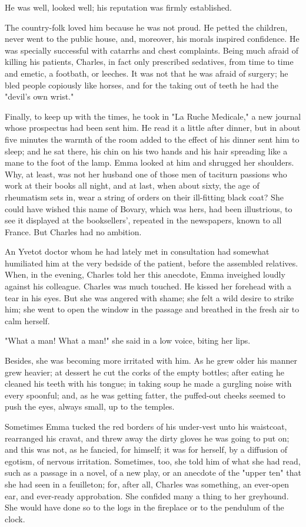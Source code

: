\documentclass[11pt,twocolumn]{ltugboat}
\begin{document}
He was well, looked well; his reputation was firmly established.

The country-folk loved him because he was not proud. He petted the
children, never went to the public house, and, moreover, his morals
inspired confidence. He was specially successful with catarrhs and chest
complaints. Being much afraid of killing his patients, Charles, in fact
only prescribed sedatives, from time to time and emetic, a footbath,
or leeches. It was not that he was afraid of surgery; he bled people
copiously like horses, and for the taking out of teeth he had the
"devil's own wrist."

Finally, to keep up with the times, he took in "La Ruche Medicale,"
a new journal whose prospectus had been sent him. He read it a little
after dinner, but in about five minutes the warmth of the room added to
the effect of his dinner sent him to sleep; and he sat there, his chin
on his two hands and his hair spreading like a mane to the foot of the
lamp. Emma looked at him and shrugged her shoulders. Why, at least, was
not her husband one of those men of taciturn passions who work at their
books all night, and at last, when about sixty, the age of rheumatism
sets in, wear a string of orders on their ill-fitting black coat?
She could have wished this name of Bovary, which was hers, had been
illustrious, to see it displayed at the booksellers', repeated in the
newspapers, known to all France. But Charles had no ambition.

An Yvetot doctor whom he had lately met in consultation had somewhat
humiliated him at the very bedside of the patient, before the assembled
relatives. When, in the evening, Charles told her this anecdote, Emma
inveighed loudly against his colleague. Charles was much touched. He
kissed her forehead with a tear in his eyes. But she was angered with
shame; she felt a wild desire to strike him; she went to open the window
in the passage and breathed in the fresh air to calm herself.

"What a man! What a man!" she said in a low voice, biting her lips.

Besides, she was becoming more irritated with him. As he grew older his
manner grew heavier; at dessert he cut the corks of the empty bottles;
after eating he cleaned his teeth with his tongue; in taking soup
he made a gurgling noise with every spoonful; and, as he was getting
fatter, the puffed-out cheeks seemed to push the eyes, always small, up
to the temples.

Sometimes Emma tucked the red borders of his under-vest unto his
waistcoat, rearranged his cravat, and threw away the dirty gloves he was
going to put on; and this was not, as he fancied, for himself; it
was for herself, by a diffusion of egotism, of nervous irritation.
Sometimes, too, she told him of what she had read, such as a passage in
a novel, of a new play, or an anecdote of the "upper ten" that she
had seen in a feuilleton; for, after all, Charles was something, an
ever-open ear, and ever-ready approbation. She confided many a thing to
her greyhound. She would have done so to the logs in the fireplace or to
the pendulum of the clock.
\end{document}
